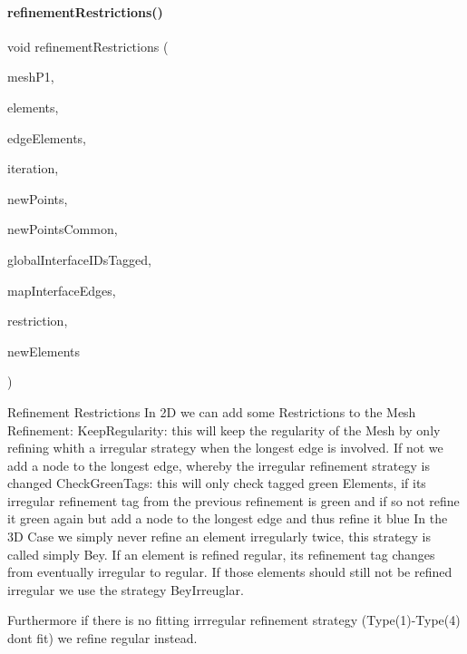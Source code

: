 \paragraph{\texorpdfstring{refinement\+Restrictions()}{refinementRestrictions()}}
{\footnotesize\ttfamily void refinement\+Restrictions (\begin{DoxyParamCaption}\item[{Mesh\+Unstr\+Ptr\+\_\+\+Type}]{mesh\+P1,  }\item[{Elements\+Ptr\+\_\+\+Type}]{elements,  }\item[{Edge\+Elements\+Ptr\+\_\+\+Type}]{edge\+Elements,  }\item[{int}]{iteration,  }\item[{int \&}]{new\+Points,  }\item[{int \&}]{new\+Points\+Common,  }\item[{vec\+\_\+\+G\+O\+\_\+\+Type \&}]{global\+Interface\+I\+Ds\+Tagged,  }\item[{Map\+Const\+Ptr\+\_\+\+Type}]{map\+Interface\+Edges,  }\item[{string}]{restriction,  }\item[{int \&}]{new\+Elements }\end{DoxyParamCaption})}



Refinement Restrictions In 2D we can add some Restrictions to the Mesh Refinement\+: Keep\+Regularity\+: this will keep the regularity of the Mesh by only refining whith a irregular strategy when the longest edge is involved. If not we add a node to the longest edge, whereby the irregular refinement strategy is changed Check\+Green\+Tags\+: this will only check tagged green Elements, if its irregular refinement tag from the previous refinement is \textquotesingle{}green\textquotesingle{} and if so not refine it green again but add a node to the longest edge and thus refine it blue In the 3D Case we simply never refine an element irregularly twice, this strategy is called simply \textquotesingle{}Bey\textquotesingle{}. If an element is refined regular, its refinement tag changes from eventually \textquotesingle{}irregular\textquotesingle{} to regular. If those elements should still not be refined irregular we use the strategy \textquotesingle{}Bey\+Irreuglar. 

Furthermore if there is no fitting irrregular refinement strategy (Type(1)-\/\+Type(4) don\textquotesingle{}t fit) we refine regular instead.


